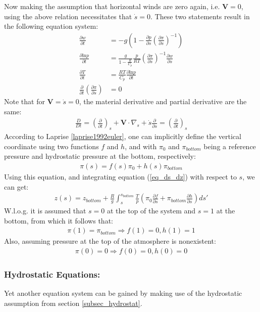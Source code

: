 Now making the assumption that horizontal winds are zero again, i.e. $\textbf{V}=0$, using the above relation necessitates that $\dot{s}=0$.
These two statements result in the following equation system:
\begin{align*}
\frac{\partial w}{\partial t} &= -g(1 - \frac{\partial p}{\partial s}(\frac{\partial \pi}{\partial s})^{-1}) \\
\frac{\partial \text{ln}p}{\partial t} &= \frac{g}{1- \frac{R}{C_p}} \frac{p}{RT}(\frac{\partial \pi}{\partial s})^{-1} \frac{\partial w}{\partial s}\\
\frac{\partial T}{\partial t} &= \frac{RT}{C_p}\frac{\partial \text{ln}p}{\partial t}\\
\frac{\partial}{\partial t}(\frac{\partial \pi}{\partial s}) &= 0
\end{align*}
Note that for $\textbf{V}=\dot{s}=0$, the material derivative and partial derivative are the same:
\begin{align*}
\frac{D}{Dt} = (\frac{\partial}{\partial t})_s + \textbf{V} \cdot \nabla _s + \dot{s}\frac{\partial }{\partial s} = (\frac{\partial}{\partial t})_s
\end{align*}
According to Laprise \ref{laprise1992euler}, one can implicitly define the vertical coordinate using two functions $f$ and $h$, and with $\pi_0$ and $\pi _{bottom}$ being a reference pressure and hydrostatic pressure at the bottom, respectively:
\begin{align*}
\pi (s) = f(s)\pi_0 + h(s)\pi_{bottom}
\end{align*}
Using this equation, and integrating equation (\ref{eq_ds_dz}) with respect to $s$, we can get:
\begin{align*}
z(s) = z_{bottom} + \frac{R}{g}\int _s ^{s_{bottom}} \frac{T}{p}(\pi_0 \frac{\partial f}{\partial s} + \pi_{bottom} \frac{\partial h}{\partial s})ds'
\end{align*}
W.l.o.g. it is assumed that $s=0$ at the top of the system and $s=1$ at the bottom, from which it follows that:
\begin{align*}
\pi(1) = \pi_{bottom} \Rightarrow f(1) = 0 , h(1) = 1
\end{align*}
Also, assuming pressure at the top of the atmosphere is nonexistent:
\begin{align*}
\pi(0) = 0 \Rightarrow f(0) = 0, h(0) = 0
\end{align*}

\subsubsection{Hydrostatic Equations:}
Yet another equation system can be gained by making use of the hydrostatic assumption from section \ref{subsec_hydrostat}.

